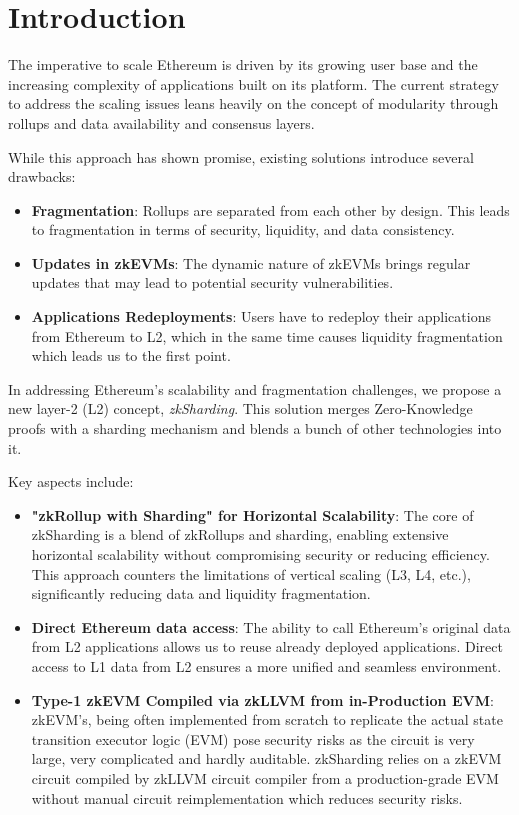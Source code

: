 \section{Introduction}
\label{section:introduction}

The imperative to scale Ethereum is driven by its growing user base and the 
increasing complexity of applications built on its platform. The current 
strategy to address the scaling issues leans heavily on the concept of modularity 
through rollups and data availability and consensus layers.

While this approach has shown promise, existing solutions introduce several drawbacks:
\begin{itemize}
    \item \textbf{Fragmentation}:
      Rollups are separated from each other by design. 
      This leads to fragmentation in terms of security, liquidity, and data consistency.
    \item \textbf{Updates in zkEVMs}:
        The dynamic nature of zkEVMs brings regular updates that may lead 
        to potential security vulnerabilities.
    \item \textbf{Applications Redeployments}:
        Users have to redeploy their applications from Ethereum to L2, which in
        the same time causes liquidity fragmentation which leads us to the first
        point. 
\end{itemize}

In addressing Ethereum's scalability and fragmentation challenges, 
we propose a new layer-2 (L2) concept, \textit{zkSharding}.
This solution merges Zero-Knowledge proofs with a sharding mechanism and blends 
a bunch of other \nil technologies into it. 

Key aspects include:
\begin{itemize}
    \item \textbf{"zkRollup with Sharding" for Horizontal Scalability}:
    The core of zkSharding is a blend of zkRollups and sharding, enabling extensive 
    horizontal scalability without compromising security or reducing efficiency. 
    This approach counters the limitations of vertical scaling (L3, L4, etc.),
    significantly reducing data and liquidity fragmentation.
    \item \textbf{Direct Ethereum data access}:
    The ability to call Ethereum's original data from L2 applications allows us 
    to reuse already deployed applications. Direct access to L1 data from L2 
    ensures a more unified and seamless environment.
    \item \textbf{Type-1 zkEVM Compiled via zkLLVM from in-Production EVM}:
        zkEVM's, being often implemented from scratch to replicate the actual
        state transition executor logic (EVM) pose security risks as the circuit
        is very large, very complicated and hardly auditable. zkSharding relies
        on a zkEVM circuit compiled by zkLLVM circuit compiler from a 
        production-grade EVM without manual circuit reimplementation which
        reduces security risks.
\end{itemize}

